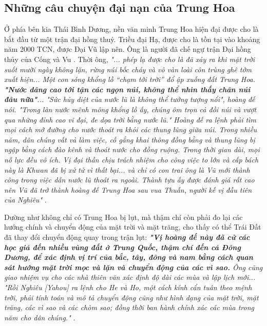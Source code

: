 \documentclass[10pt,twocolumn,letterpaper]{article}
\begin{document}
\subsection{Những câu chuyện đại nạn của Trung Hoa}

Ở phía bên kia Thái Bình Dương, nền văn minh Trung Hoa hiện đại được cho là bắt đầu từ một trận đại hồng thuỷ. Triều đại Hạ, được cho là tồn tại vào khoảng năm 2000 TCN, được Đại Vũ lập nên. Ông là người đã chế ngự trận Đại hồng thủy của Cống và Vu \cite{6}. Thời ông, \textit{"... phép lạ được cho là đã xảy ra khi mặt trời suốt mười ngày không lặn, rừng núi bốc cháy và vô vàn loài côn trùng ghê tởm xuất hiện... Một con sóng khổng lồ “chạm tới trời” đổ ập xuống đất Trung Hoa. \textbf{"Nước dâng cao tới tận các ngọn núi, không thể nhìn thấy chân núi đâu nữa"}... "Sức hủy diệt của nước lũ là không thể tưởng tượng nổi", hoàng đế nói. "Trong làn nước mênh mông khổng lồ ấy, chúng ôm trọn cả đồi núi và vượt qua những đỉnh cao vĩ đại, đe dọa trời bằng nước lũ." Hoàng đế ra lệnh phải tìm mọi cách mở đường cho nước thoát ra khỏi các thung lũng giữa núi. Trong nhiều năm, dân chúng vất vả làm việc, cố gắng khai thông đồng bằng và thung lũng bị ngập bằng cách đào kênh và thoát nước cho đồng ruộng. Trong thời gian dài, mọi nỗ lực đều vô ích. Vị đại thần chịu trách nhiệm cho công việc to lớn và cấp bách này là Khwan đã bị xử tử vì thất bại... và chỉ có con trai ông là Vũ mới thành công trong việc dẫn nước lũ thoát ra ngoài. Thành tựu ấy được đánh giá rất cao nên Vũ đã trở thành hoàng đế Trung Hoa sau vua Thuấn, người kế vị đầu tiên của Nghiêu"} \cite{5}.

Dường như không chỉ có Trung Hoa bị lụt, mà thậm chí còn phải đo lại các hướng chính và chuyển động của mặt trời và mặt trăng, cho thấy có thể Trái Đất đã thay đổi chuyển động quay trong trận lụt: \textit{\textbf{"Vị hoàng đế này đã cử các học giả đến nhiều vùng đất ở Trung Quốc, thậm chí đến cả Đông Dương, để xác định vị trí của bắc, tây, đông và nam bằng cách quan sát hướng mặt trời mọc và lặn và chuyển động của các vì sao.} Ông cũng giao nhiệm vụ cho các nhà thiên văn xác định độ dài các mùa và lập lịch mới... "Rồi Nghiêu [Yahou] ra lệnh cho He và Ho, một cách kính cẩn tuân theo mệnh trời, phải tính toán và mô tả chuyển động cũng như hình dạng của mặt trời, mặt trăng, các vì sao và các chòm sao; đồng thời ban hành chính xác các mùa trong năm cho dân chúng."} \cite{5}.
\end{document}
